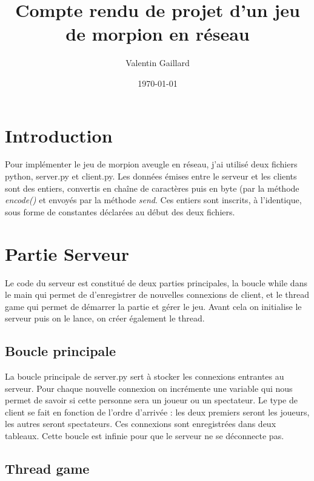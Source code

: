 \documentclass[11pt,a4paper]{report}
\title{Compte rendu de projet d'un jeu de morpion en réseau}
\author{Valentin Gaillard}
\date{\today}
\begin{document}
\maketitle

\tableofcontents


\chapter{Introduction}
\quad Pour implémenter le jeu de morpion aveugle en réseau, j'ai utilisé deux fichiers python, server.py et client.py. Les données émises entre le serveur et les clients sont des entiers, convertis en chaîne de caractères puis en byte (par la méthode \textit{encode()} et envoyés par la méthode \textit{send}. Ces entiers sont inscrits, à l'identique, sous forme de constantes déclarées au début des deux fichiers.   

\chapter{Partie Serveur}
\quad Le code du serveur est constitué de deux parties principales, la boucle while dans le main qui permet de d'enregistrer de nouvelles connexions de client, et le thread game qui permet de démarrer la partie et gérer le jeu. Avant cela on initialise le serveur puis on le lance, on créer également le thread.

\section{Boucle principale}
\quad La boucle principale de server.py sert à stocker les connexions entrantes au serveur. Pour chaque nouvelle connexion on incrémente une variable qui nous permet de savoir si cette personne sera un joueur ou un spectateur. Le type de client se fait en fonction de l'ordre d'arrivée : les deux premiers seront les joueurs, les autres seront spectateurs. Ces connexions sont enregistrées dans deux tableaux. Cette boucle est infinie pour que le serveur ne se déconnecte pas.

\newpage

\section{Thread game}
\end{document}
